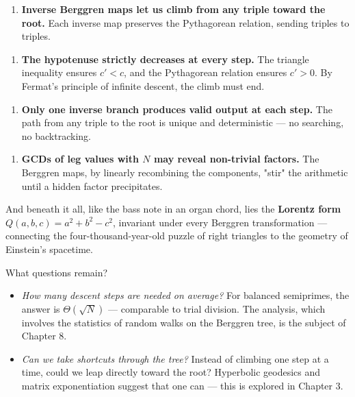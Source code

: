 \begin{enumerate}[leftmargin=*]
\item \textbf{Inverse Berggren maps let us climb from any triple toward the root.} Each inverse map preserves the Pythagorean relation, sending triples to triples.
\end{enumerate}

\begin{enumerate}[leftmargin=*]
\item \textbf{The hypotenuse strictly decreases at every step.} The triangle inequality ensures $c' < c$, and the Pythagorean relation ensures $c' > 0$. By Fermat's principle of infinite descent, the climb must end.
\end{enumerate}

\begin{enumerate}[leftmargin=*]
\item \textbf{Only one inverse branch produces valid output at each step.} The path from any triple to the root is unique and deterministic --- no searching, no backtracking.
\end{enumerate}

\begin{enumerate}[leftmargin=*]
\item \textbf{GCDs of leg values with $N$ may reveal non-trivial factors.} The Berggren maps, by linearly recombining the components, "stir" the arithmetic until a hidden factor precipitates.
\end{enumerate}

And beneath it all, like the bass note in an organ chord, lies the \textbf{Lorentz form} $Q(a,b,c) = a^2 + b^2 - c^2$, invariant under every Berggren transformation --- connecting the four-thousand-year-old puzzle of right triangles to the geometry of Einstein's spacetime.

What questions remain?

\begin{itemize}[leftmargin=*]
\item \textit{How many descent steps are needed on average?} For balanced semiprimes, the answer is $\Theta(\sqrt{N})$ --- comparable to trial division. The analysis, which involves the statistics of random walks on the Berggren tree, is the subject of Chapter 8.
\end{itemize}

\begin{itemize}[leftmargin=*]
\item \textit{Can we take shortcuts through the tree?} Instead of climbing one step at a time, could we leap directly toward the root? Hyperbolic geodesics and matrix exponentiation suggest that one can --- this is explored in Chapter 3.
\end{itemize}

